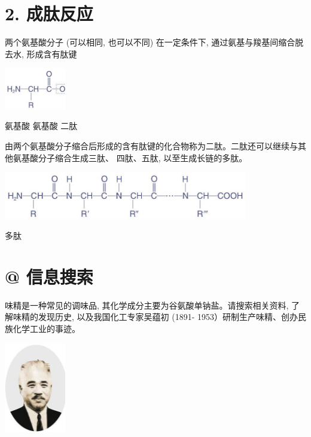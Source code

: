 \documentclass[10pt]{article}
\begin{document}
\section*{2. 成肽反应}

两个氨基酸分子 (可以相同, 也可以不同) 在一定条件下, 通过氨基与羧基间缩合脱去水, 形成含有肽键

\begin{center}
\includegraphics[max width=0.2\textwidth]{images/0190efc5-b58a-7c43-bfb0-e0a030df9cfd_118_467270.jpg}
\end{center}

氨基酸 氨基酸 二肽

由两个氨基酸分子缩合后形成的含有肽键的化合物称为二肽。二肽还可以继续与其他氨基酸分子缩合生成三肽、 四肽、五肽, 以至生成长链的多肽。

\begin{center}
\includegraphics[max width=0.8\textwidth]{images/0190efc5-b58a-7c43-bfb0-e0a030df9cfd_118_641461.jpg}
\end{center}

多肽

\section*{@ 信息搜索}

味精是一种常见的调味品, 其化学成分主要为谷氨酸单钠盐。请搜索相关资料, 了解味精的发现历史, 以及我国化工专家吴蕴初 (1891- 1953）研制生产味精、创办民族化学工业的事迹。

\begin{center}
\includegraphics[max width=0.2\textwidth]{images/0190efc5-b58a-7c43-bfb0-e0a030df9cfd_118_629938.jpg}
\end{center}
\end{document}
